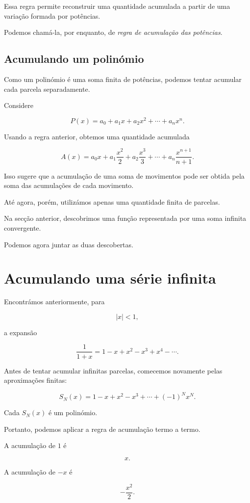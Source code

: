 \documentclass[12pt,a4paper]{article}
\begin{document}
Essa regra permite reconstruir uma quantidade acumulada a partir de uma
variação formada por potências.

Podemos chamá-la, por enquanto, de \emph{regra de acumulação das
potências}.

\subsection{Acumulando um polinómio}

Como um polinómio é uma soma finita de potências, podemos tentar acumular
cada parcela separadamente.

Considere

\[
P(x)=a_0+a_1x+a_2x^2+\cdots+a_nx^n.
\]

Usando a regra anterior, obtemos uma quantidade acumulada

\[
A(x)
=
a_0x
+
a_1\frac{x^2}{2}
+
a_2\frac{x^3}{3}
+\cdots+
a_n\frac{x^{n+1}}{n+1}.
\]

Isso sugere que a acumulação de uma soma de movimentos pode ser obtida
pela soma das acumulações de cada movimento.

Até agora, porém, utilizámos apenas uma quantidade finita de parcelas.

Na secção anterior, descobrimos uma função representada por uma soma
infinita convergente.

Podemos agora juntar as duas descobertas.

\section{Acumulando uma série infinita}

Encontrámos anteriormente, para

\[
|x|<1,
\]

a expansão

\[
\frac{1}{1+x}
=
1-x+x^2-x^3+x^4-\cdots.
\]

Antes de tentar acumular infinitas parcelas, comecemos novamente pelas
aproximações finitas:

\[
S_N(x)
=
1-x+x^2-x^3+\cdots+(-1)^Nx^N.
\]

Cada \(S_N(x)\) é um polinómio.

Portanto, podemos aplicar a regra de acumulação termo a termo.

A acumulação de \(1\) é

\[
x.
\]

A acumulação de \(-x\) é

\[
-\frac{x^2}{2}.
\]
\end{document}
